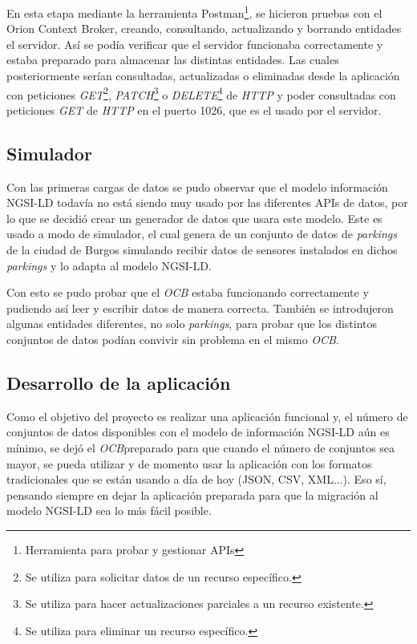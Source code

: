 En esta etapa mediante la herramienta Postman\footnote{Herramienta para probar y gestionar APIs}, se hicieron pruebas con el Orion Context Broker, creando, consultando, actualizando y borrando entidades el servidor. Así se podía verificar que el servidor funcionaba correctamente y estaba preparado para almacenar las distintas entidades.
Las cuales posteriormente serían consultadas, actualizadas o eliminadas desde la aplicación con peticiones \textit{GET}\footnote{Se utiliza para solicitar datos de un recurso específico.}, \textit{PATCH}\footnote{Se utiliza para hacer actualizaciones parciales a un recurso existente.} o \textit{DELETE}\footnote{Se utiliza para eliminar un recurso específico.} de \textit{HTTP} y poder consultadas con peticiones \textit{GET} de \textit{HTTP} en el puerto 1026, que es el usado por el servidor.

\subsection{Simulador}\label{simulador}

Con las primeras cargas de datos se pudo observar que el modelo información NGSI-LD todavía no está siendo muy usado por las diferentes APIs de datos, por lo que se decidió crear un generador de datos que usara este modelo. Este es usado a modo de simulador, el cual genera de un conjunto de datos de \textit{parkings} de la ciudad de Burgos simulando recibir datos de sensores instalados en dichos \textit{parkings} y lo adapta al modelo NGSI-LD. 



Con esto se pudo probar que el \textit{OCB}\footnotemark{} estaba funcionando correctamente y pudiendo así leer y escribir datos de manera correcta. También se introdujeron algunas entidades diferentes, no solo \textit{parkings}, para probar que los distintos conjuntos de datos podían convivir sin problema en el mismo \textit{OCB}\footnotemark[\value{footnote}]. 



\subsection{Desarrollo de la aplicación}

Como el objetivo del proyecto es realizar una aplicación funcional y, el número de conjuntos de datos disponibles con el modelo de información NGSI-LD aún es mínimo, se dejó el \textit{OCB}\footnotemark[\value{footnote}] preparado para que cuando el número de conjuntos sea mayor, se pueda utilizar y de momento usar la aplicación con los formatos tradicionales que se están usando a día de hoy (JSON, CSV, XML...). Eso sí, pensando siempre en dejar la aplicación preparada para que la migración al modelo NGSI-LD sea lo más fácil posible.

